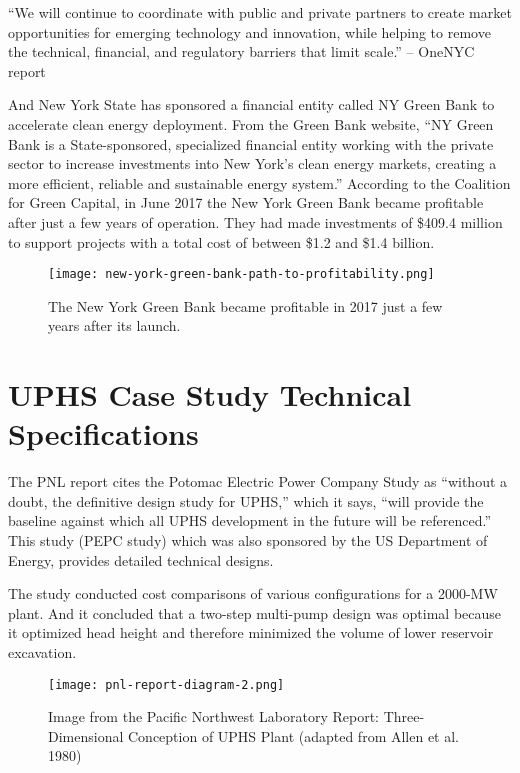 \documentclass[hidelinks,12pt,a4paper]{article}
\begin{document}
\begin{displayquote}
“We will continue to coordinate with public and private partners to create market opportunities for emerging technology and innovation, while helping to remove the technical, financial, and regulatory barriers that limit scale.” \cite{OneNYC2050FullReport} -- OneNYC report
\end{displayquote}

And New York State has sponsored a financial entity called NY Green Bank to accelerate clean energy deployment. From the Green Bank website, “NY Green Bank is a State-sponsored, specialized financial entity working with the private sector to increase investments into New York’s clean energy markets, creating a more efficient, reliable and sustainable energy system.” \cite{NYGreenBank} According to the Coalition for Green Capital, in June 2017 the New York Green Bank became profitable after just a few years of operation. They had made investments of \$409.4 million to support projects with a total cost of between \$1.2 and \$1.4 billion. \cite{NYGreenBankPathToProfitability}

\begin{figure}[ht!]
    \centering
    \texttt{[image: new-york-green-bank-path-to-profitability.png]}
    \caption{The New York Green Bank became profitable in 2017 just a few years after its launch. \cite{NYGreenBankPathToProfitability}}
\end{figure}
\FloatBarrier

\pagebreak[4]
\section{UPHS Case Study Technical Specifications}

The PNL report cites the Potomac Electric Power Company Study as
“without a doubt, the definitive design study for UPHS,” which it says, “will provide the baseline against which all UPHS development in the future will be referenced.” This study (PEPC study) which was also sponsored by the US Department of Energy, provides detailed technical designs.

The study conducted cost comparisons of various configurations for a 2000-MW plant. And it concluded that a two-step multi-pump design was optimal because it optimized head height and therefore minimized the volume of lower reservoir excavation. \cite{UndergroundPumpedHydroelectricStorage}


\begin{figure}[ht!]
    \centering
    \texttt{[image: pnl-report-diagram-2.png]}
    \caption{Image from the Pacific Northwest Laboratory Report: Three-Dimensional Conception of UPHS Plant (adapted from Allen et al. 1980) \cite{UndergroundPumpedHydroelectricStorage}}
\end{figure}
\FloatBarrier
\end{document}

